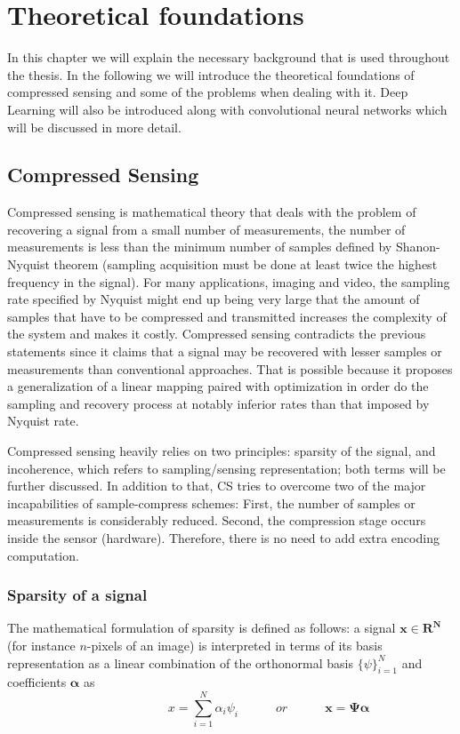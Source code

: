 \chapter{Theoretical foundations}
In this chapter we will explain the necessary background that is used throughout the thesis. In the following we will introduce the theoretical foundations of compressed sensing and some of the problems when dealing with it. Deep Learning will also be introduced along with convolutional neural networks which will be discussed in more detail.  

\section{Compressed Sensing}

Compressed sensing is mathematical theory that deals with the problem of recovering a signal from a small number of measurements, the number of measurements is less than the minimum number of samples defined by Shanon-Nyquist theorem (sampling acquisition must be done at least twice the highest frequency in the signal). For many applications, imaging and video, the sampling rate specified by Nyquist might end up being very large that the amount of samples that have to be compressed and transmitted increases the complexity of the system and makes it costly. Compressed sensing contradicts the previous statements since it claims that a signal may be recovered with lesser samples or measurements than conventional approaches. That is possible because it proposes a generalization of a linear mapping paired with optimization in order do the sampling and recovery process at notably inferior rates than that imposed by Nyquist rate. \

Compressed sensing heavily relies on two principles: sparsity of the signal, and incoherence, which refers to sampling/sensing representation; both terms will be further discussed. In addition to that, CS tries to overcome two of the major incapabilities of sample-compress schemes: First, the number of samples or measurements is considerably reduced. Second, the compression stage occurs inside the sensor (hardware). Therefore, there is no need to add extra encoding computation.

\FloatBarrier

\subsection{Sparsity of a signal}
The mathematical formulation of sparsity is defined as follows: a signal $\mathbf{x \in R^N}$ (for instance $n$-pixels of an image) is interpreted in terms of its basis representation as a linear combination of the orthonormal basis $\{\psi\}_{i=1}^{N}$ and coefficients $\mathbf{\alpha}$ as  
\begin{equation} \label{eq:signal}
\hspace{3em} \hspace{3em} x = \sum\limits_{i=1}^N \alpha_{i} \psi_{i} \hspace{3em} or \hspace{3em} \mathbf{x = \Psi \alpha}
\end{equation} 

